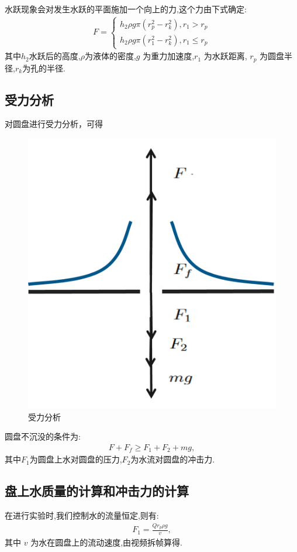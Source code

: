 \documentclass[UTF8]{gapd}
\begin{document}
水跃现象会对发生水跃的平面施加一个向上的力,这个力由下式确定:
\begin{align}
    F=\begin{cases}
        h_2\rho g \pi (r_p^2-r_k^2),r_1>r_p\\
        h_2\rho g \pi (r_1^2-r_k^2),r_1\le r_p
    \end{cases} \label{eq:unsinkable_disc_core}
\end{align}
其中$h_2$水跃后的高度,$\rho$为液体的密度,$g$ 为重力加速度,$r_1$  为水跃距离, $r_p$ 为圆盘半径,$r_k$为孔的半径.
\subsection{受力分析}

对圆盘进行受力分析，可得
\begin{figure}[!htbp]%
  \centering
  \includegraphics[width=0.8\columnwidth]{images/f_analysis.png}
  \caption{受力分析} 
  \label{fig:unsinkable_disc_force_analysis}%
\end{figure}

圆盘不沉没的条件为:
\begin{align}
    F+F_f\ge F_1+F_2+mg,
\end{align}
其中$F_1$为圆盘上水对圆盘的压力,$F_2$为水流对圆盘的冲击力.

\subsection{盘上水质量的计算和冲击力的计算}
在进行实验时,我们控制水的流量恒定,则有:
\begin{align}
    F_1=\frac{Qr_p\rho g}{v},
\end{align}
其中 $v$ 为水在圆盘上的流动速度,由视频拆帧算得.
\end{document}
